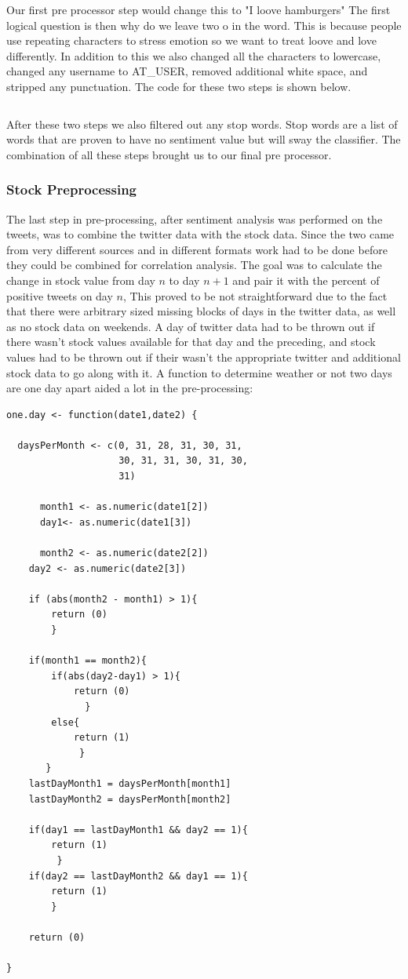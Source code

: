 \documentclass{acm_proc_article-sp}
\begin{document}
Our first pre processor step would
change this to "I loove hamburgers" The first logical question is then why do
we leave two o in the word. This is because people use repeating characters to
stress emotion so we want to treat loove and love differently. In addition to
this we also changed all the characters to lowercase, changed any username to
AT\_USER, removed additional white space, and stripped any punctuation. The
code for these two steps is shown below.

\break
\inputminted{python}{examples/preTweet.py}

After these two steps we also filtered out any stop words. Stop words are a
list of words that are proven to have no sentiment value but will sway the
classifier. The combination of all these steps brought us to our final pre
processor.

\subsubsection{Stock Preprocessing}
 
The last step in pre-processing, after sentiment analysis was performed on the
tweets, was to combine the twitter data with the stock data. Since the two came
from very different sources and in different formats work had to be done before
they could be combined for correlation analysis. The goal was to calculate the
change in stock value from day $n$ to day $n+1$ and pair it with the percent of
positive tweets on day $n$, This proved to be not straightforward due to the
fact that there were arbitrary sized missing blocks of days in the twitter
data, as well as no stock data on weekends. A day of twitter data had to be
thrown out if there wasn't stock values available for that day and the
preceding, and stock values had to be thrown out if their wasn't the
appropriate twitter and additional stock data to go along with it. A function
to determine weather or not two days are one day apart aided a lot in the
pre-processing:

\break 
\begin{verbatim}
one.day <- function(date1,date2) {

  daysPerMonth <- c(0, 31, 28, 31, 30, 31, 
                    30, 31, 31, 30, 31, 30, 
                    31)
       
      month1 <- as.numeric(date1[2])
      day1<- as.numeric(date1[3])

      month2 <- as.numeric(date2[2])
    day2 <- as.numeric(date2[3])

    if (abs(month2 - month1) > 1){
        return (0)
        }

    if(month1 == month2){
        if(abs(day2-day1) > 1){
            return (0)
              }
        else{
            return (1)
             }
       }
    lastDayMonth1 = daysPerMonth[month1]
    lastDayMonth2 = daysPerMonth[month2]

    if(day1 == lastDayMonth1 && day2 == 1){
        return (1)
         }
    if(day2 == lastDayMonth2 && day1 == 1){
        return (1)
        }

    return (0)

}

\end{verbatim}
\end{document}
